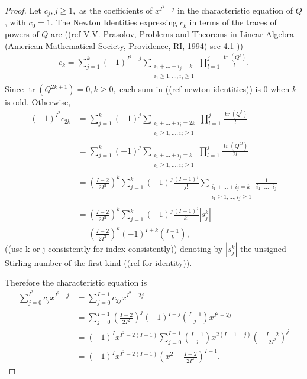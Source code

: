 \documentclass{article}
\DeclareMathOperator{\tr}{tr}
\newcommand{\I}{I}
\newcommand{\Q}{Q}
\renewcommand{\t}[1]{\tr(\Q^{#1})}
\newcommand{\coef}{c}
\begin{document}
\begin{proof}
  Let $\coef_j,j\ge 1,$ as the coefficients of $x^{\I^2-j}$ in the
  characteristic equation of $\Q$, with $\coef_0=1$.  The Newton Identities expressing $\coef_k$ in terms of the traces of powers of $\Q$ are ((ref
  V.V. Prasolov, Problems and Theorems in Linear Algebra (American
  Mathematical Society, Providence, RI, 1994) sec 4.1 )) 
  \begin{align}
    \coef_k = \sum_{j=1}^k(-1)^{\I^2-j}\sum_{\substack{i_1+\ldots+i_j=k\\i_1\ge 1,\ldots,i_j\ge 1}}\prod_{l=1}^j\frac{\t{l}}{l}.
  \end{align}
  Since $\t{2k+1}=0,k\ge 0,$ each sum in ((ref newton identities)) is
  $0$ when $k$ is odd. Otherwise,
  \begin{align}
    (-1)^{\I^2}\coef_{2k} &= \sum_{j=1}^k(-1)^j\sum_{\substack{i_1+\ldots+i_j=2k\\i_1\ge 1,\ldots,i_j\ge 1}}\prod_{l=1}^j\frac{\t{l}}{l}\\
                        &= \sum_{j=1}^k(-1)^j\sum_{\substack{i_1+\ldots+i_j=k\\i_1\ge 1,\ldots,i_j\ge 1}}\prod_{l=1}^j\frac{\t{2l}}{2l}\\
                        &= \left(\frac{\I-2}{2\I^2}\right)^k\sum_{j=1}^k(-1)^j\frac{(\I-1)^j}{j!}\sum_{\substack{i_1+\ldots+i_j=k\\i_1\ge 1,\ldots,i_j\ge 1}}\frac{1}{i_1\cdot\ldots\cdot i_j}\\
                        &= \left(\frac{\I-2}{2\I^2}\right)^k\sum_{j=1}^k(-1)^j\frac{(\I-1)^j}{k!}|s^k_j|\\
                        &=\left(\frac{\I-2}{2\I^2}\right)^k(-1)^{\I+k}{\I-1\choose k},
  \end{align}
  ((use k or j consistently for index consistently)) denoting by $|s^k_j|$ the unsigned Stirling number of the first kind ((ref for identity)).
  
  Therefore the characteristic equation is
  \begin{align}
    \sum_{j=0}^{\I^2} \coef_j x^{\I^2-j} &= \sum_{j=0}^{\I-1}\coef_{2j}x^{\I^2-2j}\\
                                         &= \sum_{j=0}^{\I-1}\left(\frac{\I-2}{2\I^2}\right)^j(-1)^{\I+j}{\I-1\choose j}x^{\I^2-2j}\\
                                         &= (-1)^{\I}x^{\I^2-2(\I-1)}\sum_{j=0}^{\I-1}{\I-1\choose j}x^{2(\I-1-j)}\left(-\frac{\I-2}{2\I^2}\right)^j\\
                                         &=(-1)^{\I}x^{\I^2-2(\I-1)}\left(x^2-\frac{\I-2}{2\I^2}\right)^{\I-1}.
  \end{align}
  
\end{proof}
\end{document}
